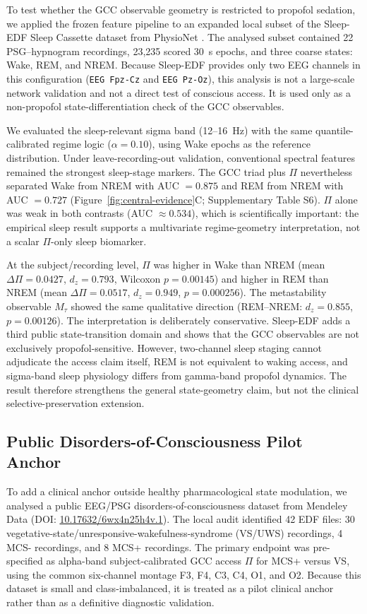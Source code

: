\documentclass[11pt,a4paper]{article}
\theoremstyle{plain}
\theoremstyle{definition}
\theoremstyle{remark}
\begin{document}
To test whether the GCC observable geometry is restricted to propofol sedation, we applied the frozen feature pipeline to an expanded local subset of the Sleep-EDF Sleep Cassette dataset from PhysioNet \citep{kemp2000}. The analysed subset contained 22 PSG--hypnogram recordings, 23,235 scored 30~s epochs, and three coarse states: Wake, REM, and NREM. Because Sleep-EDF provides only two EEG channels in this configuration (\texttt{EEG Fpz-Cz} and \texttt{EEG Pz-Oz}), this analysis is not a large-scale network validation and not a direct test of conscious access. It is used only as a non-propofol state-differentiation check of the GCC observables.

We evaluated the sleep-relevant sigma band (12--16~Hz) with the same quantile-calibrated regime logic ($\alpha=0.10$), using Wake epochs as the reference distribution. Under leave-recording-out validation, conventional spectral features remained the strongest sleep-stage markers. The GCC triad plus $\Pi$ nevertheless separated Wake from NREM with AUC $=0.875$ and REM from NREM with AUC $=0.727$ (Figure~\ref{fig:central-evidence}C; Supplementary Table S6). $\Pi$ alone was weak in both contrasts (AUC $\approx0.534$), which is scientifically important: the empirical sleep result supports a multivariate regime-geometry interpretation, not a scalar $\Pi$-only sleep biomarker.


At the subject/recording level, $\Pi$ was higher in Wake than NREM (mean $\Delta\Pi=0.0427$, $d_z=0.793$, Wilcoxon $p=0.00145$) and higher in REM than NREM (mean $\Delta\Pi=0.0517$, $d_z=0.949$, $p=0.000256$). The metastability observable $M_\tau$ showed the same qualitative direction (REM--NREM: $d_z=0.855$, $p=0.00126$). The interpretation is deliberately conservative. Sleep-EDF adds a third public state-transition domain and shows that the GCC observables are not exclusively propofol-sensitive. However, two-channel sleep staging cannot adjudicate the access claim itself, REM is not equivalent to waking access, and sigma-band sleep physiology differs from gamma-band propofol dynamics. The result therefore strengthens the general state-geometry claim, but not the clinical selective-preservation extension.

\subsection{Public Disorders-of-Consciousness Pilot Anchor}
\label{sec:doc-anchor}

To add a clinical anchor outside healthy pharmacological state modulation, we analysed a public EEG/PSG disorders-of-consciousness dataset from Mendeley Data (DOI: \href{https://doi.org/10.17632/6wx4n25h4v.1}{10.17632/6wx4n25h4v.1}). The local audit identified 42 EDF files: 30 vegetative-state/unresponsive-wakefulness-syndrome (VS/UWS) recordings, 4 MCS- recordings, and 8 MCS+ recordings. The primary endpoint was pre-specified as alpha-band subject-calibrated GCC access $\Pi$ for MCS+ versus VS, using the common six-channel montage F3, F4, C3, C4, O1, and O2. Because this dataset is small and class-imbalanced, it is treated as a pilot clinical anchor rather than as a definitive diagnostic validation.
\end{document}
